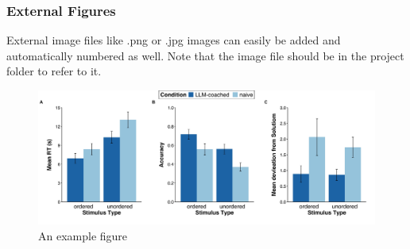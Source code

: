 \subsubsection{External Figures}
External image files like .png or .jpg images can easily be added and automatically numbered as well. Note that the image file should be in the project folder to refer to it.

\begin{figure}
     \caption{An example figure}
     \includegraphics[width=\linewidth]{Tables & Figures/DCTplot.jpg}
     
 \end{figure}
